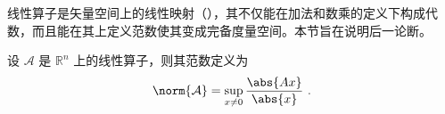 线性算子是矢量空间上的线性映射（），其不仅能在加法和数乘的定义下构成代数，而且能在其上定义范数使其变成完备度量空间。本节旨在说明后一论断。
\begin{definition}{}
设 $\mathcal A$ 是 $\mathbb R^n$ 上的线性算子，则其范数定义为
\begin{equation}
\norm{\mathcal A}=\sup_{x\neq0}\frac{\abs{Ax}}{\abs{x}}~.
\end{equation}

\end{definition}